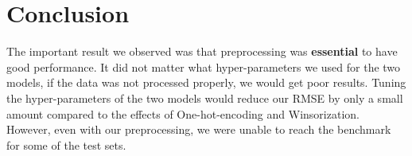 \documentclass{article}
\begin{document}
\section{Conclusion}

The important result we observed was that preprocessing was \textbf{essential} to have good performance. It did not matter what hyper-parameters we used for the two models, if the data was not processed properly, we would get poor results. Tuning the hyper-parameters of the two models would reduce our RMSE by only a small amount compared to the effects of One-hot-encoding and Winsorization. However, even with our preprocessing, we were unable to reach the benchmark for some of the test sets. 
\end{document}
